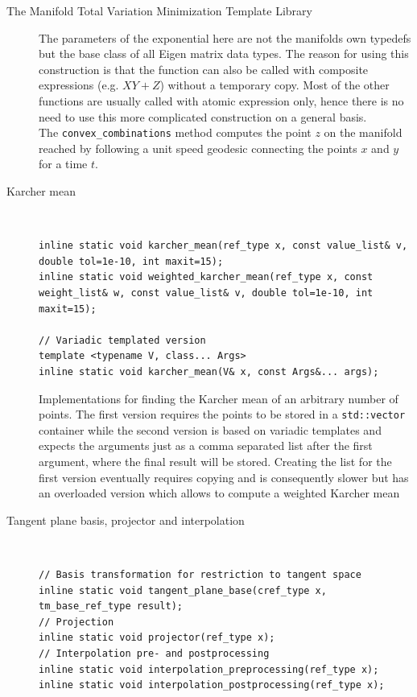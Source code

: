 \begin{chapter}{The Manifold Total Variation Minimization Template Library}
\begin{description}
	The parameters of the exponential here are not the manifolds own typedefs but the base class of all Eigen matrix data types. The reason for using this construction is that the function
	can also be called with composite expressions (e.g. $XY+Z$) without a temporary copy. Most of the other functions are usually called with atomic expression only, hence there is no
	need to use this more complicated construction on a general basis.\\
	The \texttt{convex\_combinations} method computes the point $z$ on the manifold reached by following a unit speed geodesic connecting the points $x$ and $y$ for a time $t$.

    \item[Karcher mean] \hfill \\
	\cppinline
	\begin{lstlisting}
inline static void karcher_mean(ref_type x, const value_list& v, double tol=1e-10, int maxit=15);
inline static void weighted_karcher_mean(ref_type x, const weight_list& w, const value_list& v, double tol=1e-10, int maxit=15);

// Variadic templated version
template <typename V, class... Args>
inline static void karcher_mean(V& x, const Args&... args);
	\end{lstlisting}
	
	Implementations for finding the Karcher mean of an arbitrary number of points. The first version requires the points to be stored in a \texttt{std::vector} container while
	the second version is based on variadic templates and expects the arguments just as a comma separated list after the first argument, where the final result will be stored.
	Creating the list for the first version eventually requires copying and is consequently slower but has an overloaded version which allows to compute a weighted Karcher mean
    
    \item[Tangent plane basis, projector and interpolation] \hfill \\
	\cppinline
	\begin{lstlisting}
// Basis transformation for restriction to tangent space
inline static void tangent_plane_base(cref_type x, tm_base_ref_type result);
// Projection
inline static void projector(ref_type x);
// Interpolation pre- and postprocessing
inline static void interpolation_preprocessing(ref_type x);
inline static void interpolation_postprocessing(ref_type x);
	\end{lstlisting}


\end{description}
\end{chapter}
